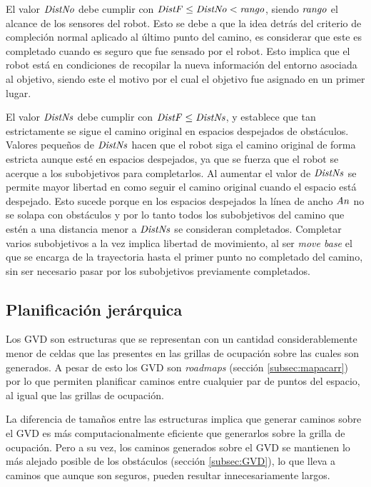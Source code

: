 El valor $\mathit{DistNo}$ debe cumplir con $\mathit{DistF}\leq\mathit{DistNo}<\mathit{rango}$, siendo
$\mathit{rango}$ el alcance de los sensores del robot. Esto se debe a que la idea
detrás del criterio de compleción normal aplicado al último punto del camino, es
considerar que este es completado cuando es seguro que fue sensado por el robot.
Esto implica que el robot está en condiciones de recopilar la nueva información
del entorno asociada al objetivo, siendo este el motivo por el cual el objetivo
fue asignado en un primer lugar.

El valor $\mathit{DistNs}$ debe cumplir con $\mathit{DistF}\leq\mathit{DistNs}$, y
establece que tan estrictamente se sigue el camino original en espacios
despejados de obstáculos. Valores pequeños de $\mathit{DistNs}$ hacen que el robot
siga el camino original de forma estricta aunque esté en espacios despejados,
ya que se fuerza que el robot se acerque a los subobjetivos para completarlos.
Al aumentar el valor de $\mathit{DistNs}$ se permite mayor libertad en como seguir
el camino original cuando el espacio está despejado. Esto sucede porque en los
espacios despejados la línea de ancho $\mathit{An}$ no se solapa con obstáculos y
por lo tanto todos los subobjetivos del camino que estén a una distancia menor
a $\mathit{DistNs}$ se consideran completados. Completar varios subobjetivos a la
vez implica libertad de movimiento, al ser \emph{move base} el que se encarga
de la trayectoria hasta el primer punto no completado del camino, sin ser
necesario pasar por los subobjetivos previamente completados.

\subsection{Planificación jerárquica}
Los GVD son estructuras que se representan con un cantidad considerablemente
menor de celdas que las presentes en las grillas de ocupación sobre las cuales son
generados. A pesar de esto los GVD son \emph{roadmaps} (sección
\ref{subsec:mapacarr}) por lo que permiten planificar caminos entre cualquier
par de puntos del espacio, al igual que las grillas de ocupación. 

La diferencia de tamaños entre las estructuras implica que generar caminos
sobre el GVD es más computacionalmente eficiente que generarlos sobre la grilla
de ocupación. Pero a su vez, los caminos generados sobre el GVD se mantienen lo
más alejado posible de los obstáculos (sección \ref{subsec:GVD}), lo que lleva
a caminos que aunque son seguros, pueden resultar innecesariamente largos.

